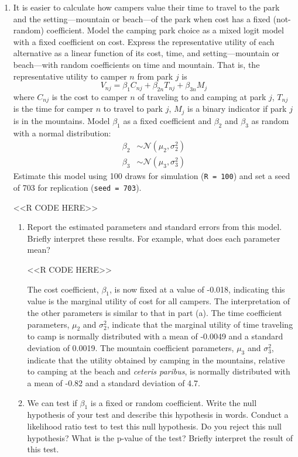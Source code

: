 \documentclass[11pt,letterpaper]{article}
\begin{document}
\begin{enumerate}[label=\alph*., leftmargin=*]
	\item It is easier to calculate how campers value their time to travel to the park and the setting---mountain or beach---of the park when cost has a fixed (not-random) coefficient. Model the camping park choice as a mixed logit model with a fixed coefficient on cost. Express the representative utility of each alternative as a linear function of its cost, time, and setting---mountain or beach---with random coefficients on time and mountain. That is, the representative utility to camper $n$ from park $j$ is
	$$V_{nj} = \beta_1 C_{nj} + \beta_{2n} T_{nj} + \beta_{3n} M_j$$
	where $C_{nj}$ is the cost to camper $n$ of traveling to and camping at park $j$, $T_{nj}$ is the time for camper $n$ to travel to park $j$, $M_j$ is a binary indicator if park $j$ is in the mountains. Model $\beta_1$ as a fixed coefficient and $\beta_2$ and $\beta_3$ as random with a normal distribution:
	\begin{align*}
		\beta_2 & \sim \mathcal{N}(\mu_2, \sigma_2^2) \\
		\beta_3 & \sim \mathcal{N}(\mu_3, \sigma_3^2)
	\end{align*}
	Estimate this model using 100 draws for simulation (\texttt{R = 100}) and set a seed of 703 for replication (\texttt{seed = 703}).

	<<R CODE HERE>>

	\begin{enumerate}[label=\roman*.]
		\item Report the estimated parameters and standard errors from this model. Briefly interpret these results. For example, what does each parameter mean?

		<<R CODE HERE>>

		The cost coefficient, $\beta_1$, is now fixed at a value of -0.018, indicating this value is the marginal utility of cost for all campers. The interpretation of the other parameters is similar to that in part (a). The time coefficient parameters, $\mu_2$ and $\sigma_2^2$, indicate that the marginal utility of time traveling to camp is normally distributed with a mean of -0.0049 and a standard deviation of 0.0019. The mountain coefficient parameters, $\mu_3$ and $\sigma_3^2$, indicate that the utility obtained by camping in the mountains, relative to camping at the beach and \emph{ceteris paribus}, is normally distributed with a mean of -0.82 and a standard deviation of 4.7.

		\item We can test if $\beta_1$ is a fixed or random coefficient. Write the null hypothesis of your test and describe this hypothesis in words. Conduct a likelihood ratio test to test this null hypothesis. Do you reject this null hypothesis? What is the p-value of the test? Briefly interpret the result of this test.


\end{enumerate}
\end{enumerate}
\end{document}
